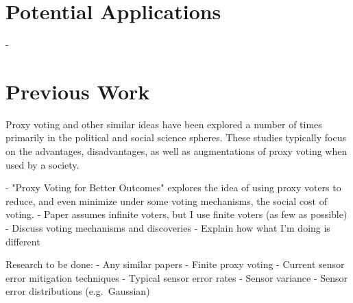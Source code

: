 

\section{Potential Applications}\label{sec:potential-applications}
- %


\section{Previous Work}\label{sec:previous-work}  %
Proxy voting and other similar ideas have been explored a number of times
primarily in the political and social science spheres\cite{Cohensius2017, Mueller1972, Zhang2022, Goelz2021}.
These studies typically focus on the advantages, disadvantages, as well as
augmentations of proxy voting when used by a society.

- "Proxy Voting for Better Outcomes"\cite{Cohensius2017} explores the idea of
using proxy voters to reduce, and even minimize under some voting mechanisms,
the social cost of voting.
- Paper assumes infinite voters, but I use finite voters (as few as possible)
- Discuss voting mechanisms and discoveries
- Explain how what I'm doing is different

Research to be done:
- Any similar papers
- Finite proxy voting
- Current sensor error mitigation techniques
- Typical sensor error rates
- Sensor variance
- Sensor error distributions (e.g.\ Gaussian)

